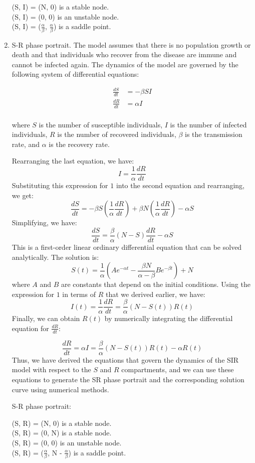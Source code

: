 \documentclass{article}
\begin{document}
\begin{enumerate}
(S, I) = (N, 0) is a stable node.\\
(S, I) = (0, 0) is an unstable node.\\
(S, I) = ($\frac{\alpha}{\beta}$, $\frac{\alpha}{\beta}$) is a saddle point.

\item S-R phase portrait.
The model assumes that there is no population growth or death and that individuals who recover from the disease are immune and cannot be infected again. The dynamics of the model are governed by the following system of differential equations:

\begin{align}
\frac{dS}{dt} &= -\beta S I \\
\frac{dR}{dt} &= \alpha I \\
\end{align}

where $S$ is the number of susceptible individuals, $I$ is the number of infected individuals, $R$ is the number of recovered individuals, $\beta$ is the transmission rate, and $\alpha$ is the recovery rate.

Rearranging the last equation, we have:
$$
I=\frac{1}{\alpha} \frac{d R}{d t}
$$
Substituting this expression for $1$ into the second equation and rearranging, we get:
$$
\frac{d S}{d t}=-\beta S\left(\frac{1}{\alpha} \frac{d R}{d t}\right)+\beta N\left(\frac{1}{\alpha} \frac{d R}{d t}\right)-\alpha S
$$
Simplifying, we have:
$$
\frac{d S}{d t}=\frac{\beta}{\alpha}(N-S) \frac{d R}{d t}-\alpha S
$$
This is a first-order linear ordinary differential equation that can be solved analytically. The solution is:
$$
S(t)=\frac{1}{\alpha}\left(A e^{-\alpha t}-\frac{\beta N}{\alpha-\beta} B e^{-\beta t}\right)+N
$$
where $A$ and $B$ are constants that depend on the initial conditions. Using the expression for $1$ in terms of $R$ that we derived earlier, we have:
$$
I(t)=\frac{1}{\alpha} \frac{d R}{d t}=\frac{\beta}{\alpha}(N-S(t)) R(t)
$$
Finally, we can obtain $R(t)$ by numerically integrating the differential equation for $\frac{dR}{dt}$:


$$
\frac{d R}{d t}=\alpha I=\frac{\beta}{\alpha}(N-S(t)) R(t)-\alpha R(t)
$$
Thus, we have derived the equations that govern the dynamics of the SIR model with respect to the $S$ and $R$ compartments, and we can use these equations to generate the SR phase portrait and the corresponding solution curve using numerical methods.

S-R phase portrait:

(S, R) = (N, 0) is a stable node.\\
(S, R) = (0, N) is a stable node.\\
(S, R) = (0, 0) is an unstable node.\\
(S, R) = ($\frac{\alpha}{\beta}$, N - $\frac{\alpha}{\beta}$) is a saddle point.



\end{enumerate}
\end{document}
